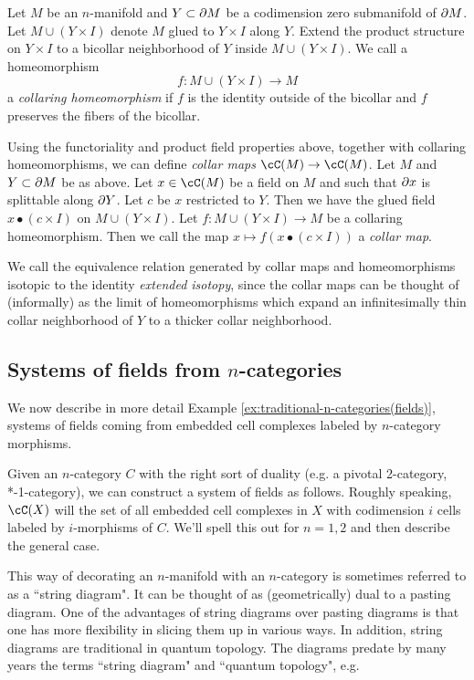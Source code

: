 \medskip


Let $M$ be an $n$-manifold and $Y \subset \partial M$ be a codimension zero submanifold
of $\partial M$.
Let $M \cup (Y\times I)$ denote $M$ glued to $Y\times I$ along $Y$.
Extend the product structure on $Y\times I$ to a bicollar neighborhood of 
$Y$ inside $M \cup (Y\times I)$.
We call a homeomorphism
\[
	f: M \cup (Y\times I) \to M
\]
a {\it collaring homeomorphism} if $f$ is the identity outside of the bicollar
and $f$ preserves the fibers of the bicollar.

Using the functoriality and product field properties above, together
with collaring homeomorphisms, we can define 
{\it collar maps} $\cC(M)\to \cC(M)$.
Let $M$ and $Y \subset \partial M$ be as above.
Let $x \in \cC(M)$ be a field on $M$ and such that $\partial x$ is splittable along $\partial Y$.
Let $c$ be $x$ restricted to $Y$.
Then we have the glued field $x \bullet (c\times I)$ on $M \cup (Y\times I)$.
Let $f: M \cup (Y\times I) \to M$ be a collaring homeomorphism.
Then we call the map $x \mapsto f(x \bullet (c\times I))$ a {\it collar map}.

We call the equivalence relation generated by collar maps and
homeomorphisms isotopic to the identity {\it extended isotopy}, since the collar maps
can be thought of (informally) as the limit of homeomorphisms
which expand an infinitesimally thin collar neighborhood of $Y$ to a thicker
collar neighborhood.




\subsection{Systems of fields from \texorpdfstring{$n$}{n}-categories}
\label{sec:example:traditional-n-categories(fields)}
We now describe in more detail Example \ref{ex:traditional-n-categories(fields)}, 
systems of fields coming from embedded cell complexes labeled
by $n$-category morphisms.

Given an $n$-category $C$ with the right sort of duality
(e.g. a pivotal 2-category, *-1-category),
we can construct a system of fields as follows.
Roughly speaking, $\cC(X)$ will the set of all embedded cell complexes in $X$
with codimension $i$ cells labeled by $i$-morphisms of $C$.
We'll spell this out for $n=1,2$ and then describe the general case.

This way of decorating an $n$-manifold with an $n$-category is sometimes referred to
as a ``string diagram".
It can be thought of as (geometrically) dual to a pasting diagram.
One of the advantages of string diagrams over pasting diagrams is that one has more
flexibility in slicing them up in various ways.
In addition, string diagrams are traditional in quantum topology.
The diagrams predate by many years the terms ``string diagram" and 
``quantum topology", e.g. \cite{MR0281657,MR776784} %

